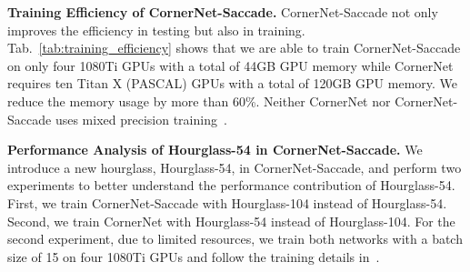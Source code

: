 \documentclass{bmvc2k}
\begin{document}
\smallskip \noindent \textbf{Training Efficiency of CornerNet-Saccade.} CornerNet-Saccade not only improves the efficiency in testing but also in training. Tab.~\ref{tab:training_efficiency} shows that we are able to train CornerNet-Saccade on only four 1080Ti GPUs with a total of 44GB GPU memory while CornerNet requires ten Titan X (PASCAL) GPUs with a total of 120GB GPU memory. We reduce the memory usage by more than 60\%. Neither CornerNet nor CornerNet-Saccade uses mixed precision training~\cite{micikevicius2017mixed}.

\smallskip \noindent \textbf{Performance Analysis of Hourglass-54 in CornerNet-Saccade.} We introduce a new hourglass, Hourglass-54, in CornerNet-Saccade, and perform two experiments to better understand the performance contribution of Hourglass-54. First, we train CornerNet-Saccade with Hourglass-104 instead of Hourglass-54. Second, we train CornerNet with Hourglass-54 instead of Hourglass-104. For the second experiment, due to limited resources, we train both networks with a batch size of 15 on four 1080Ti GPUs and follow the training details in~\cite{law2018cornernet}. 

\begin{table}[h]
    \centering
    \caption{Hourglass-54 produces better results when combined with saccade on the COCO validation set.}
    \label{tab:hourglass_54}
\end{table}
\end{document}
